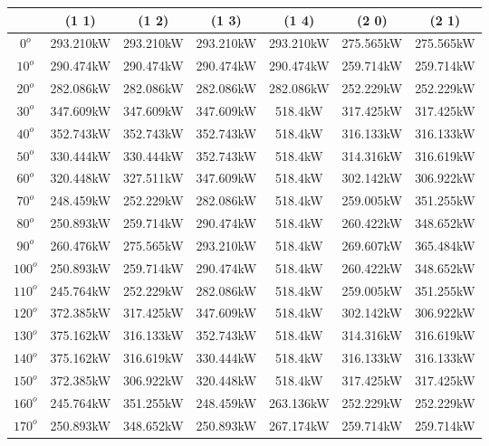         \begin{table}[H]
        	\centering
        	\begin{tabular}{|c|c|c|c|c|c|c|} \hline
        			& (1 1)		& (1 2)		& (1 3)		& (1 4)		& (2 0)		& (2 1)		\\ \hline
		$0^o$	& 293.210kW	& 293.210kW	& 293.210kW	& 293.210kW	& 275.565kW	& 275.565kW	\\ \hline
		$10^o$	& 290.474kW	& 290.474kW	& 290.474kW	& 290.474kW	& 259.714kW	& 259.714kW	\\ \hline
		$20^o$	& 282.086kW	& 282.086kW	& 282.086kW	& 282.086kW	& 252.229kW	& 252.229kW	\\ \hline
		$30^o$	& 347.609kW	& 347.609kW	& 347.609kW	& 518.4kW	& 317.425kW	& 317.425kW	\\ \hline
		$40^o$	& 352.743kW	& 352.743kW	& 352.743kW	& 518.4kW	& 316.133kW	& 316.133kW	\\ \hline
		$50^o$	& 330.444kW	& 330.444kW	& 352.743kW	& 518.4kW	& 314.316kW	& 316.619kW	\\ \hline
		$60^o$	& 320.448kW	& 327.511kW	& 347.609kW	& 518.4kW	& 302.142kW	& 306.922kW	\\ \hline
		$70^o$	& 248.459kW	& 252.229kW	& 282.086kW	& 518.4kW	& 259.005kW	& 351.255kW	\\ \hline
		$80^o$	& 250.893kW	& 259.714kW	& 290.474kW	& 518.4kW	& 260.422kW	& 348.652kW	\\ \hline
		$90^o$	& 260.476kW	& 275.565kW	& 293.210kW	& 518.4kW	& 269.607kW	& 365.484kW	\\ \hline
		$100^o$	& 250.893kW	& 259.714kW	& 290.474kW	& 518.4kW	& 260.422kW	& 348.652kW	\\ \hline
		$110^o$	& 245.764kW	& 252.229kW	& 282.086kW	& 518.4kW	& 259.005kW	& 351.255kW	\\ \hline
		$120^o$	& 372.385kW	& 317.425kW	& 347.609kW	& 518.4kW	& 302.142kW	& 306.922kW	\\ \hline
		$130^o$	& 375.162kW	& 316.133kW	& 352.743kW	& 518.4kW	& 314.316kW	& 316.619kW	\\ \hline
		$140^o$	& 375.162kW	& 316.619kW	& 330.444kW	& 518.4kW	& 316.133kW	& 316.133kW	\\ \hline
		$150^o$	& 372.385kW	& 306.922kW	& 320.448kW	& 518.4kW	& 317.425kW	& 317.425kW	\\ \hline
		$160^o$	& 245.764kW	& 351.255kW	& 248.459kW	& 263.136kW	& 252.229kW	& 252.229kW	\\ \hline
		$170^o$	& 250.893kW	& 348.652kW	& 250.893kW	& 267.174kW	& 259.714kW	& 259.714kW	\\ \hline

\end{tabular}
\end{table}

